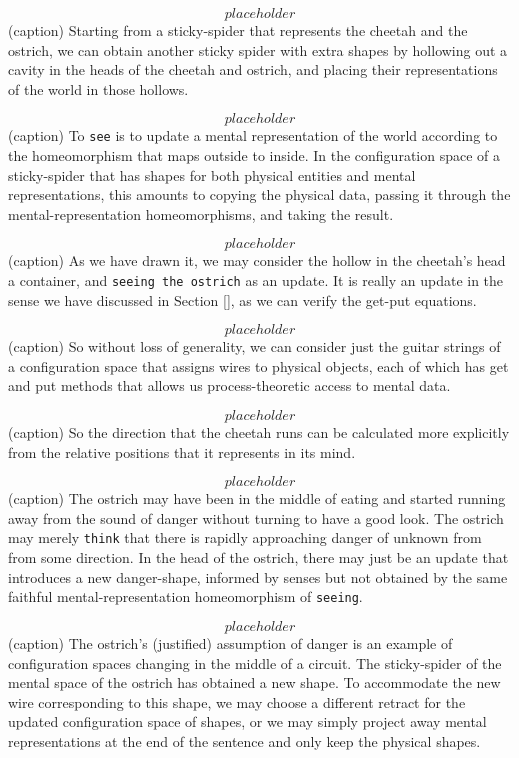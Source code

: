\[placeholder\]
(caption) Starting from a sticky-spider that represents the cheetah and the ostrich, we can obtain another sticky spider with extra shapes by hollowing out a cavity in the heads of the cheetah and ostrich, and placing their representations of the world in those hollows.

\[placeholder\]
(caption) To \texttt{see} is to update a mental representation of the world according to the homeomorphism that maps outside to inside. In the configuration space of a sticky-spider that has shapes for both physical entities and mental representations, this amounts to copying the physical data, passing it through the mental-representation homeomorphisms, and taking the result.

\[placeholder\]
(caption) As we have drawn it, we may consider the hollow in the cheetah's head a container, and \texttt{seeing the ostrich} as an update. It is really an update in the sense we have discussed in Section \ref{}, as we can verify the get-put equations.

\[placeholder\]
(caption) So without loss of generality, we can consider just the guitar strings of a configuration space that assigns wires to physical objects, each of which has get and put methods that allows us process-theoretic access to mental data. 

\[placeholder\]
(caption) So the direction that the cheetah runs can be calculated more explicitly from the relative positions that it represents in its mind.

\[placeholder\]
(caption) The ostrich may have been in the middle of eating and started running away from the sound of danger without turning to have a good look. The ostrich may merely \texttt{think} that there is rapidly approaching danger of unknown from from some direction. In the head of the ostrich, there may just be an update that introduces a new danger-shape, informed by senses but not obtained by the same faithful mental-representation homeomorphism of \texttt{seeing}.

\[placeholder\]
(caption) The ostrich's (justified) assumption of danger is an example of configuration spaces changing in the middle of a circuit. The sticky-spider of the mental space of the ostrich has obtained a new shape. To accommodate the new wire corresponding to this shape, we may choose a different retract for the updated configuration space of shapes, or we may simply project away mental representations at the end of the sentence and only keep the physical shapes.

